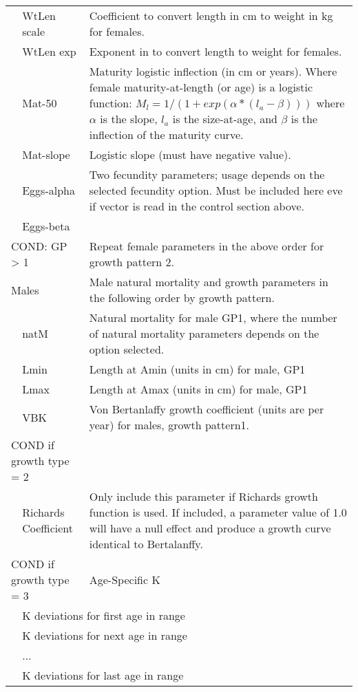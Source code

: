 \begin{longtable}{p{1cm} p{2.5cm} p{10cm}}
	\Tstrut & WtLen scale & Coefficient to convert length in cm to weight in kg for females.\\
	& WtLen exp & Exponent in to convert length to weight for females.\\
	& Mat-50 & Maturity logistic inflection (in cm or years).  Where female maturity-at-length (or age) is a logistic function: $M_{l} = 1/(1+exp(\alpha*(l_{a} - \beta)))$ where $\alpha$ is the slope, $l_{a}$ is the size-at-age, and $\beta$ is the inflection of the maturity curve. \\ 
	& Mat-slope & Logistic slope (must have negative value). \\
	& Eggs-alpha & Two fecundity parameters; usage depends on the selected fecundity option.  Must be included here eve if vector is read in the control section above.\\
	& Eggs-beta & \Bstrut\\
	\hline

	\multicolumn{2}{l}{COND: GP > 1} \Tstrut & Repeat female parameters in the above order for growth pattern 2.\Bstrut\\
	\hline

	\multicolumn{2}{l}{Males} \Tstrut & Male natural mortality and growth parameters in the following order by growth pattern. \Bstrut\\
	& natM & Natural mortality for male GP1, where the number of natural mortality parameters depends on the option selected.\\
	& Lmin & Length at Amin (units in cm) for male, GP1\\
	& Lmax & Length at Amax (units in cm) for male, GP1\ \\
	& VBK &  Von Bertanlaffy growth coefficient (units are per year) for males, growth pattern1.\Bstrut\\
	\hline

	\multicolumn{2}{l}{COND if growth type = 2 } & \Tstrut\\
	& Richards Coefficient & Only include this parameter if Richards growth function is used.  If included, a parameter value of 1.0 will have a null effect and produce a growth curve identical to Bertalanffy.\\
	\multicolumn{2}{l}{COND if growth type = 3 } & Age-Specific K \\
	& \multicolumn{2}{l}{K deviations for first age in range}\\
	& \multicolumn{2}{l}{K deviations for next age in range}\\
	& ... & \\
	& \multicolumn{2}{l}{K deviations for last age in range}\Bstrut\\
	\hline


\end{longtable}
